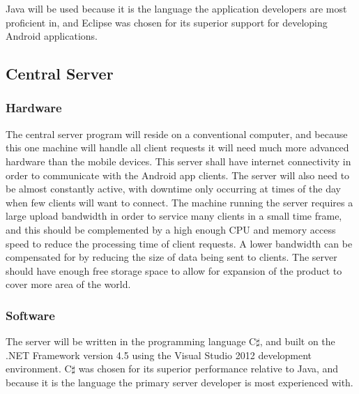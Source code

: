 			Java will be used because it is the language the application developers are most proficient in, and Eclipse was chosen for its superior support for developing Android applications.
	\subsection{Central Server}
		\subsubsection{Hardware}
			The central server program will reside on a conventional computer, and because this one machine will handle all client requests it will need much more advanced hardware than the mobile devices. This server shall have internet connectivity in order to communicate with the Android app clients. The server will also need to be almost constantly active, with downtime only occurring at times of the day when few clients will want to connect. The machine running the server requires a large upload bandwidth in order to service many clients in a small time frame, and this should be complemented by a high enough CPU and memory access speed to reduce the processing time of client requests. A lower bandwidth can be compensated for by reducing the size of data being sent to clients. The server should have enough free storage space to allow for expansion of the product to cover more area of the world.
		\subsubsection{Software}
			The server will be written in the programming language C$\sharp$, and built on the .NET Framework version 4.5 using the Visual Studio 2012 development environment. C$\sharp$ was chosen for its superior performance relative to Java, and because it is the language the primary server developer is most experienced with. 